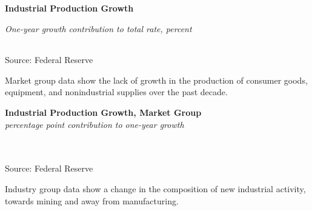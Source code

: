 \documentclass{report}
\makeatletter
\newcommand{\tbllink}[1]{\href{https://raw.githubusercontent.com/bdecon/US-chartbook/master/chartbook/data/#1}{\faTable}}
\newcommand*\short[1]{\expandafter\@gobbletwo\number\numexpr#1\relax}
\newcommand{\sbar}[4]{
		\addplot[ybar stacked, bar width=2.5pt, draw opacity=0, fill=#1] 
			table [x=#2, y=#3, col sep=comma]{#4};}
\newcommand{\dateaxisticks}{
		date coordinates in=x, axis line style={draw=none},
		xmax={2021-05-15},
		max space between ticks=40,	    
		xtick={{1990-01-01}, {1992-01-01}, {1994-01-01}, 
			{1996-01-01}, {1998-01-01}, {2000-01-01}, 
			{2002-01-01}, {2004-01-01}, {2006-01-01},
			{2008-01-01}, {2010-01-01}, {2012-01-01}, {2014-01-01},
		    {2016-01-01}, {2018-01-01}, {2020-01-01}},
		minor xtick={{1989-01-01}, {1991-01-01}, {1993-01-01},
			{1995-01-01}, {1997-01-01}, {1999-01-01}, 
			{2001-01-01}, {2003-01-01}, {2005-01-01}, {2007-01-01},
		    {2009-01-01}, {2011-01-01}, {2013-01-01}, {2015-01-01},
		    {2017-01-01}, {2019-01-01}, {2021-01-01}},
		enlarge y limits={0.06}, enlarge x limits={0.01},
		}
\newcommand{\bbar}[2]{extra #1 ticks = {{#2}}, extra #1 tick labels = ,
		extra #1 tick style = {grid=major, grid style={thick, black!25}},}
\newcommand{\rbars}{
		\fill[color=black!10] (axis cs:{1990-07-01},\pgfkeysvalueof{/pgfplots/ymin}) rectangle 
			(axis cs:{1991-03-01}, \pgfkeysvalueof{/pgfplots/ymax});
		\fill[color=black!10] (axis cs:{2007-12-01},\pgfkeysvalueof{/pgfplots/ymin}) rectangle 
			(axis cs:{2009-07-01}, \pgfkeysvalueof{/pgfplots/ymax});
		\fill[color=black!10] (axis cs:{2001-03-01},\pgfkeysvalueof{/pgfplots/ymin}) rectangle 
			(axis cs:{2001-11-01}, \pgfkeysvalueof{/pgfplots/ymax});
		\fill[color=black!10] (axis cs:{2020-02-01},\pgfkeysvalueof{/pgfplots/ymin}) rectangle 
			(axis cs:{2021-05-15}, \pgfkeysvalueof{/pgfplots/ymax});}
\makeatother
\begin{document}
{\begin{minipage}{0.76\textwidth}
\normalsize \textbf{Industrial Production Growth}\\
\footnotesize{\textit{One-year growth \hspace{34mm} contribution to total \hspace{12mm} rate, percent}\\
\noindent {} \setlength{\tabcolsep}{3.1pt} \color{black!90}
		{\renewcommand{\arraystretch}{1.54}
		 \begin{tabular}{p{2mm} p{44mm} R{7.3mm} R{7.3mm} R{7.3mm} R{7.3mm} | R{8mm} R{7.3mm} 
		   R{7.3mm} R{7.3mm} }
			  \hline
		\end{tabular}}\vspace{-2mm}
		
\footnotesize{Source: Federal Reserve}}
\end{minipage}
\newpage
\begin{minipage}{0.76\textwidth}
\vspace{3mm}
\small Market group data show the lack of growth in the production of consumer goods, equipment, and nonindustrial supplies over the past decade.
\vspace{1mm}

\normalsize \textbf{Industrial Production Growth, Market Group}\\
\footnotesize{\textit{percentage point contribution to one-year growth}}\\\
\hspace*{-2mm} \\
\footnotesize{Source: Federal Reserve} \hfill \tbllink{indprogr.csv}
\vspace{3mm}

\small Industry group data show a change in the composition of new industrial activity, towards mining and away from manufacturing.
\vspace{1mm}


\end{minipage}}
\end{document}
